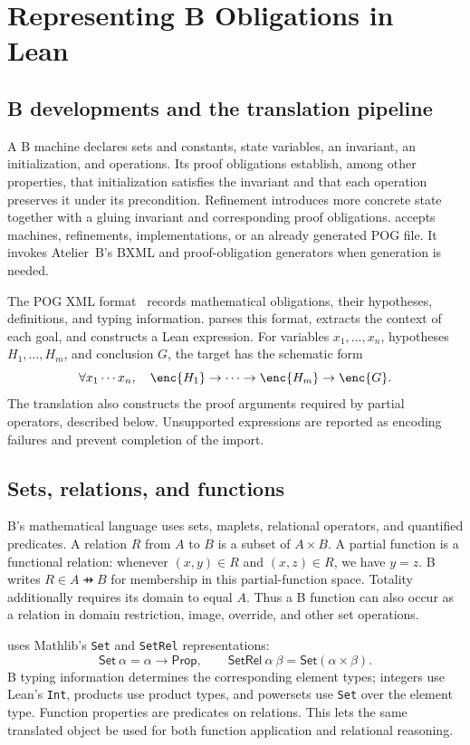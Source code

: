 \section{Representing B Obligations in Lean}
\label{sec:encoding}

\subsection{B developments and the translation pipeline}

A B machine declares sets and constants, state variables, an invariant,
an initialization, and operations. Its proof obligations establish, among
other properties, that initialization satisfies the invariant and that
each operation preserves it under its precondition. Refinement introduces
more concrete state together with a gluing invariant and corresponding
proof obligations. \barrel accepts machines, refinements, implementations,
or an already generated POG file. It invokes Atelier~B's BXML and
proof-obligation generators when generation is needed.

The POG XML format~\cite{POGXML} records mathematical obligations, their
hypotheses, definitions, and typing information. \barrel parses this
format, extracts the context of each goal, and constructs a Lean
expression. For variables $x_1,\ldots,x_n$, hypotheses
$H_1,\ldots,H_m$, and conclusion $G$, the target has the schematic form
\[
  \forall x_1\cdots x_n,\quad
  \enc{H_1}\to\cdots\to\enc{H_m}\to\enc{G}.
\]
The translation also constructs the proof arguments required by partial
operators, described below. Unsupported expressions are reported as
encoding failures and prevent completion of the import.

\subsection{Sets, relations, and functions}

B's mathematical language uses sets, maplets, relational operators, and
quantified predicates. A relation $R$ from $A$ to $B$ is a subset of
$A\times B$. A partial function is a functional relation: whenever
$(x,y)\in R$ and $(x,z)\in R$, we have $y=z$. B writes
$R\in A\pfun B$ for membership in this partial-function space. Totality additionally
requires its domain to equal $A$. Thus a B function can also occur as a
relation in domain restriction, image, override, and other set operations.

\barrel uses Mathlib's \texttt{Set} and \texttt{SetRel} representations:
\[
  \mathsf{Set}\ \alpha=\alpha\to\mathsf{Prop},\qquad
  \mathsf{SetRel}\ \alpha\ \beta=\mathsf{Set}(\alpha\times\beta).
\]
B typing information determines the corresponding element types;
integers use Lean's \texttt{Int}, products use product types, and
powersets use \texttt{Set} over the element type. Function properties
are predicates on relations. This lets the same translated object be
used for both function application and relational reasoning.


